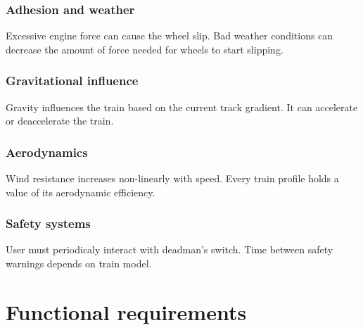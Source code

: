\documentclass[12pt,a4paper]{report}
\begin{document}
    \subsection{Adhesion and weather}
    Excessive engine force can cause the wheel slip. 
    Bad weather conditions can decrease the amount of force needed for wheels to start slipping.
    
    \subsection{Gravitational influence}
    Gravity influences the train based on the current track gradient.
    It can accelerate or deaccelerate the train.
    
    \subsection{Aerodynamics}
    Wind resistance increases non-linearly with speed. 
    Every train profile holds a value of its aerodynamic efficiency.
    
    \subsection{Safety systems}
    User must periodicaly interact with deadman's switch. 
    Time between safety warnings depends on train model.

\chapter{Functional requirements}
\end{document}
